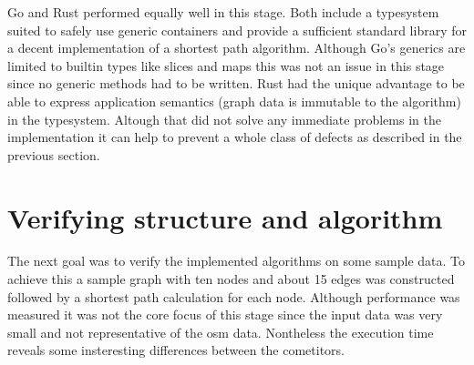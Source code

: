 Go and Rust performed equally well in this stage. Both include a typesystem suited to safely use generic containers and provide a sufficient standard library for a decent implementation of a shortest path algorithm. Although Go's generics are limited to builtin types like slices and maps this was not an issue in this stage since no generic methods had to be written. Rust had the unique advantage to be able to express application semantics (graph data is immutable to the algorithm) in the typesystem. Altough that did not solve any immediate problems in the implementation it can help to prevent a whole class of defects as described in the previous section.

\section{Verifying structure and algorithm}
\label{sec:Implementation::Verification}

The next goal was to verify the implemented algorithms on some sample data. To achieve this a sample graph with ten nodes and about 15 edges was constructed followed by a shortest path calculation for each node. Although performance was measured it was not the core focus of this stage since the input data was very small and not representative of the \gls{osm} data. Nontheless the execution time reveals some insteresting differences between the cometitors.

